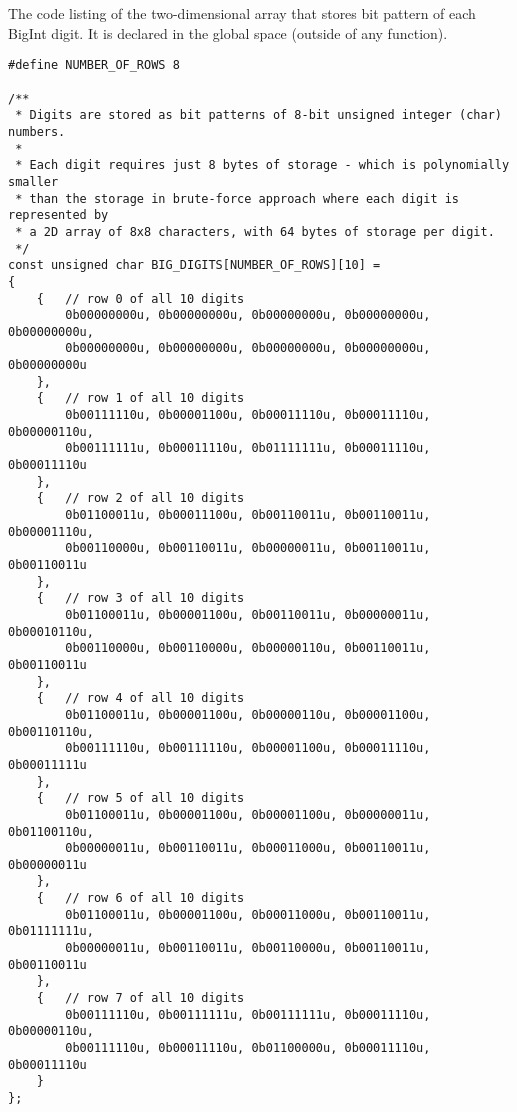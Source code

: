 \documentclass{article}
\begin{document}
\paragraph{}\
\paragraph{}\
\paragraph{}\
\paragraph{}\
\paragraph{}\
\paragraph{}\

	
	\noindent The code listing of the two-dimensional array that stores bit pattern of each BigInt digit. It is declared in the global space (outside of any function).
	
	\begin{verbatim}
#define NUMBER_OF_ROWS 8

/**
 * Digits are stored as bit patterns of 8-bit unsigned integer (char) numbers.
 *
 * Each digit requires just 8 bytes of storage - which is polynomially smaller
 * than the storage in brute-force approach where each digit is represented by
 * a 2D array of 8x8 characters, with 64 bytes of storage per digit.
 */
const unsigned char BIG_DIGITS[NUMBER_OF_ROWS][10] = 
{
    {   // row 0 of all 10 digits
        0b00000000u, 0b00000000u, 0b00000000u, 0b00000000u, 0b00000000u,
        0b00000000u, 0b00000000u, 0b00000000u, 0b00000000u, 0b00000000u
    },
    {   // row 1 of all 10 digits
        0b00111110u, 0b00001100u, 0b00011110u, 0b00011110u, 0b00000110u,
        0b00111111u, 0b00011110u, 0b01111111u, 0b00011110u, 0b00011110u
    },
    {   // row 2 of all 10 digits
        0b01100011u, 0b00011100u, 0b00110011u, 0b00110011u, 0b00001110u,
        0b00110000u, 0b00110011u, 0b00000011u, 0b00110011u, 0b00110011u
    },
    {   // row 3 of all 10 digits
        0b01100011u, 0b00001100u, 0b00110011u, 0b00000011u, 0b00010110u,
        0b00110000u, 0b00110000u, 0b00000110u, 0b00110011u, 0b00110011u
    },
    {   // row 4 of all 10 digits
        0b01100011u, 0b00001100u, 0b00000110u, 0b00001100u, 0b00110110u,
        0b00111110u, 0b00111110u, 0b00001100u, 0b00011110u, 0b00011111u
    },
    {   // row 5 of all 10 digits
        0b01100011u, 0b00001100u, 0b00001100u, 0b00000011u, 0b01100110u,
        0b00000011u, 0b00110011u, 0b00011000u, 0b00110011u, 0b00000011u
    },
    {   // row 6 of all 10 digits
        0b01100011u, 0b00001100u, 0b00011000u, 0b00110011u, 0b01111111u,
        0b00000011u, 0b00110011u, 0b00110000u, 0b00110011u, 0b00110011u
    },
    {   // row 7 of all 10 digits
        0b00111110u, 0b00111111u, 0b00111111u, 0b00011110u, 0b00000110u,
        0b00111110u, 0b00011110u, 0b01100000u, 0b00011110u, 0b00011110u
    }
};
	\end{verbatim}
	
\end{document}
